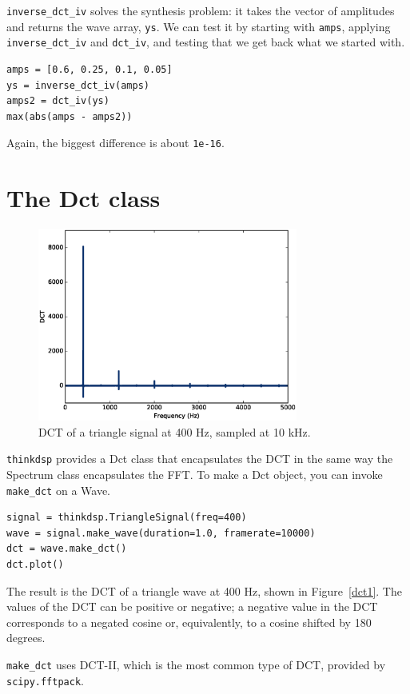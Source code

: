 \documentclass[12pt]{book}
\begin{document}
\verb"inverse_dct_iv" solves the synthesis problem: it
takes the vector of amplitudes and returns
the wave array, {\tt ys}.  We can test it by starting
with {\tt amps}, applying \verb"inverse_dct_iv" and \verb"dct_iv",
and testing that we get back what we started with.

\begin{verbatim}
amps = [0.6, 0.25, 0.1, 0.05]
ys = inverse_dct_iv(amps)
amps2 = dct_iv(ys)
max(abs(amps - amps2))
\end{verbatim}

Again, the biggest difference is about {\tt 1e-16}.


\section{The Dct class}

\begin{figure}
\centerline{\includegraphics[height=2.5in]{figs/dct1.eps}}
\caption{DCT of a triangle signal at 400 Hz, sampled at 10 kHz.}
\label{fig.dct1}
\end{figure}

{\tt thinkdsp} provides a Dct class that encapsulates the
DCT in the same way the Spectrum class encapsulates the FFT.
To make a Dct object, you can invoke \verb"make_dct" on a Wave.

\begin{verbatim}
signal = thinkdsp.TriangleSignal(freq=400)
wave = signal.make_wave(duration=1.0, framerate=10000)
dct = wave.make_dct()
dct.plot()
\end{verbatim}

The result is the DCT of a triangle wave at 400 Hz, shown in
Figure~\ref{dct1}.  The values of the DCT can be positive or negative;
a negative value in the DCT corresponds to a negated cosine or,
equivalently, to a cosine shifted by 180 degrees.

\verb"make_dct" uses DCT-II, which is the most common type of DCT,
provided by {\tt scipy.fftpack}.
\end{document}
